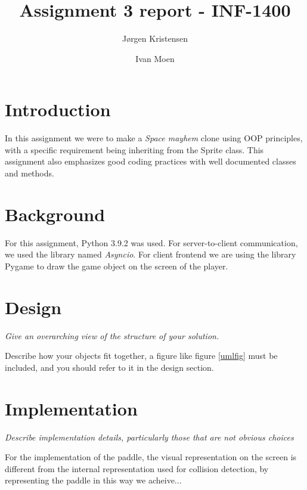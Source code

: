 \documentclass[11pt]{article}
\title{Assignment 3 report - INF-1400}
\author{Jørgen Kristensen \and Ivan Moen}
\begin{document}
    \maketitle


    \section{Introduction}

    In this assignment we were to make a \emph{Space mayhem} clone using OOP principles, with a specific requirement being inheriting from the Sprite class. This assignment also emphasizes good coding practices with well documented classes and methods.


    \section{Background}


    For this assignment, Python 3.9.2 was used. For server-to-client communication, we used the library named \emph{Asyncio}. For client frontend we are using the library Pygame to draw the game object on the screen of the player.


    \section{Design}

    \emph{Give an overarching view of the structure of your solution.}

Describe how your objects fit together, a figure like figure \ref{umlfig} must be included, and you should refer to it in the design section.



    \section{Implementation}

    \emph{Describe implementation details, particularly those that are not obvious choices}

For the implementation of the paddle, the visual representation on the screen is different from the internal representation used for collision detection, by representing the paddle in this way we acheive...
\end{document}
